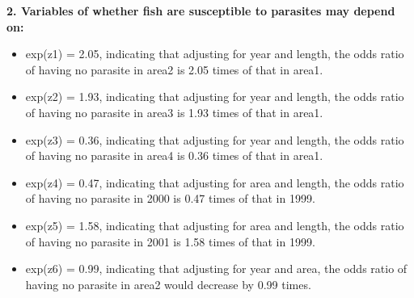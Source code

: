 \documentclass[
]{article}
\begin{document}
\textbf{2. Variables of whether fish are susceptible to parasites may
depend on:}

\begin{itemize}
\item
  exp(z1) = 2.05, indicating that adjusting for year and length, the
  odds ratio of having no parasite in area2 is 2.05 times of that in
  area1.
\item
  exp(z2) = 1.93, indicating that adjusting for year and length, the
  odds ratio of having no parasite in area3 is 1.93 times of that in
  area1.
\item
  exp(z3) = 0.36, indicating that adjusting for year and length, the
  odds ratio of having no parasite in area4 is 0.36 times of that in
  area1.
\item
  exp(z4) = 0.47, indicating that adjusting for area and length, the
  odds ratio of having no parasite in 2000 is 0.47 times of that in
  1999.
\item
  exp(z5) = 1.58, indicating that adjusting for area and length, the
  odds ratio of having no parasite in 2001 is 1.58 times of that in
  1999.
\item
  exp(z6) = 0.99, indicating that adjusting for year and area, the odds
  ratio of having no parasite in area2 would decrease by 0.99 times.
\end{itemize}
\end{document}
